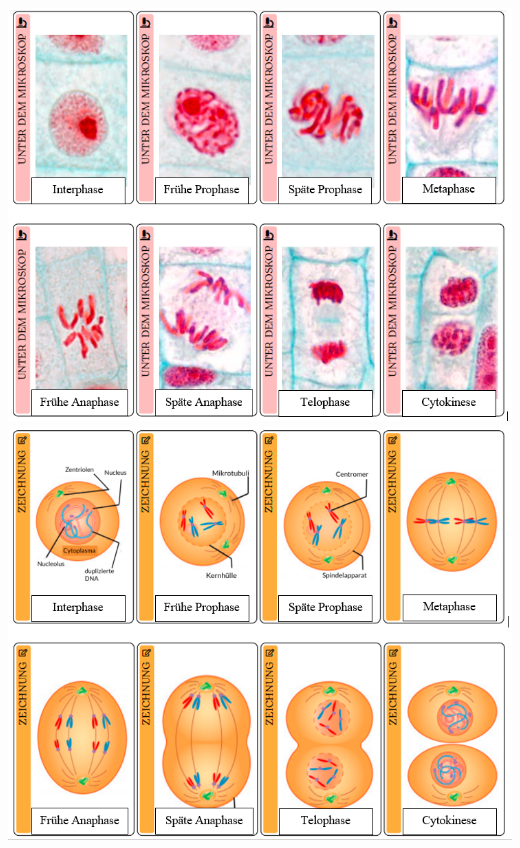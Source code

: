 \documentclass[parskip]{scrartcl}
\begin{document}
\begin{center}
	\includegraphics[scale=0.75]{solution/mikroskop.png} 		
	\includegraphics[scale=0.75]{solution/skizze.png}
\end{center}
\end{document}
